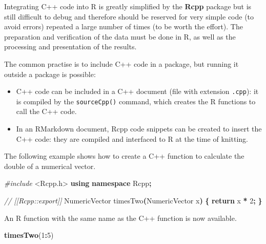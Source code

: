 \documentclass[
  12pt,
  american,
  a4paper,
  extrafontsizes,onecolumn,openright
  ]{memoir}
\newenvironment{Shaded}{\begin{snugshade}}{\end{snugshade}}
\newcommand{\CommentTok}[1]{\textcolor[rgb]{0.56,0.35,0.01}{\textit{#1}}}
\newcommand{\ControlFlowTok}[1]{\textcolor[rgb]{0.13,0.29,0.53}{\textbf{#1}}}
\newcommand{\DecValTok}[1]{\textcolor[rgb]{0.00,0.00,0.81}{#1}}
\newcommand{\FunctionTok}[1]{\textcolor[rgb]{0.13,0.29,0.53}{\textbf{#1}}}
\newcommand{\ImportTok}[1]{#1}
\newcommand{\KeywordTok}[1]{\textcolor[rgb]{0.13,0.29,0.53}{\textbf{#1}}}
\newcommand{\NormalTok}[1]{#1}
\newcommand{\OperatorTok}[1]{\textcolor[rgb]{0.81,0.36,0.00}{\textbf{#1}}}
\newcommand{\PreprocessorTok}[1]{\textcolor[rgb]{0.56,0.35,0.01}{\textit{#1}}}
\newcommand{\SpecialCharTok}[1]{\textcolor[rgb]{0.81,0.36,0.00}{\textbf{#1}}}
\providecommand{\tightlist}{%
  \setlength{\itemsep}{0pt}\setlength{\parskip}{0pt}}
\newlength{\rf}
\begin{document}
Integrating C++ code into R is greatly simplified by the \textbf{Rcpp} package but is still difficult to debug and therefore should be reserved for very simple code (to avoid errors) repeated a large number of times (to be worth the effort).
The preparation and verification of the data must be done in R, as well as the processing and presentation of the results.

The common practise is to include C++ code in a package, but running it outside a package is possible:

\begin{itemize}
\tightlist
\item
  C++ code can be included in a C++ document (file with extension \texttt{.cpp}): it is compiled by the \texttt{sourceCpp()} command, which creates the R functions to call the C++ code.
\item
  In an RMarkdown document, Rcpp code snippets can be created to insert the C++ code: they are compiled and interfaced to R at the time of knitting.
\end{itemize}

The following example shows how to create a C++ function to calculate the double of a numerical vector.

\scriptsize

\begin{Shaded}
\begin{Highlighting}[]
\PreprocessorTok{\#include }\ImportTok{\textless{}Rcpp.h\textgreater{}}
\KeywordTok{using} \KeywordTok{namespace}\NormalTok{ Rcpp}\OperatorTok{;}

\CommentTok{// [[Rcpp::export]]}
\NormalTok{NumericVector timesTwo}\OperatorTok{(}\NormalTok{NumericVector x}\OperatorTok{)} \OperatorTok{\{}
  \ControlFlowTok{return}\NormalTok{ x }\OperatorTok{*} \DecValTok{2}\OperatorTok{;}
\OperatorTok{\}}
\end{Highlighting}
\end{Shaded}

\normalsize

An R function with the same name as the C++ function is now available.

\scriptsize

\begin{Shaded}
\begin{Highlighting}[]
\FunctionTok{timesTwo}\NormalTok{(}\DecValTok{1}\SpecialCharTok{:}\DecValTok{5}\NormalTok{)}
\end{Highlighting}
\end{Shaded}
\end{document}
